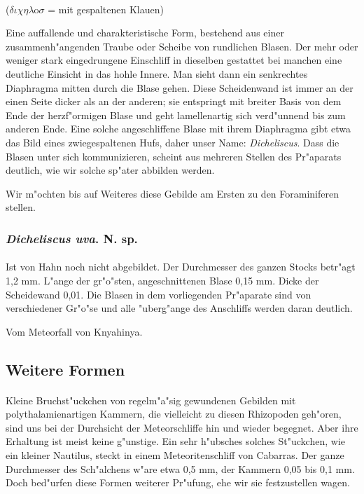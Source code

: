 \documentclass[a4paper, 11pt, oneside]{article}
\begin{document}
\paragraph{}
($\delta\iota\chi\eta\lambda$o$\sigma$ = mit gespaltenen Klauen)%

Eine auffallende und charakteristische Form, bestehend aus einer zusammenh"angenden Traube oder Scheibe von rundlichen Blasen. Der mehr oder weniger stark eingedrungene Einschliff in dieselben gestattet bei manchen eine deutliche Einsicht in das hohle Innere. Man sieht dann ein senkrechtes Diaphragma mitten durch die Blase gehen. Diese Scheidenwand ist immer an der einen Seite dicker als an der anderen; sie entspringt mit breiter Basis von dem Ende der herzf"ormigen Blase und geht lamellenartig sich verd"unnend bis zum anderen Ende. Eine solche angeschliffene Blase mit ihrem Diaphragma gibt etwa das Bild eines zwiegespaltenen Hufs, daher unser Name: \emph{Dicheliscus}. Dass die Blasen unter sich kommunizieren, scheint aus mehreren Stellen des Pr"aparats deutlich, wie wir solche sp"ater abbilden werden.

Wir m"ochten bis auf Weiteres diese Gebilde am Ersten zu den Foraminiferen stellen.
\subsubsection{\emph{Dicheliscus uva}. N. sp.}
\paragraph{}
Ist von Hahn noch nicht abgebildet. Der Durchmesser des ganzen Stocks betr"agt 1,2 mm. L"ange der gr"o"sten, angeschnittenen Blase 0,15 mm. Dicke der Scheidewand 0,01. Die Blasen in dem vorliegenden Pr"aparate sind von verschiedener Gr"o"se und alle "uberg"ange des Anschliffs werden daran deutlich.

Vom Meteorfall von Knyahinya.
\subsection{Weitere Formen}
\paragraph{}
Kleine Bruchst"uckchen von regelm"a"sig gewundenen Gebilden mit polythalamienartigen Kammern, die vielleicht zu diesen Rhizopoden geh"oren, sind uns bei der Durchsicht der Meteorschliffe hin und wieder begegnet. Aber ihre Erhaltung ist meist keine g"unstige. Ein sehr h"ubsches solches St"uckchen, wie ein kleiner Nautilus, steckt in einem Meteoritenschliff von Cabarras. Der ganze Durchmesser des Sch"alchens w"are etwa 0,5 mm, der Kammern 0,05 bis 0,1 mm. Doch bed"urfen diese Formen weiterer Pr"ufung, ehe wir sie festzustellen wagen.
\clearpage
\end{document}
